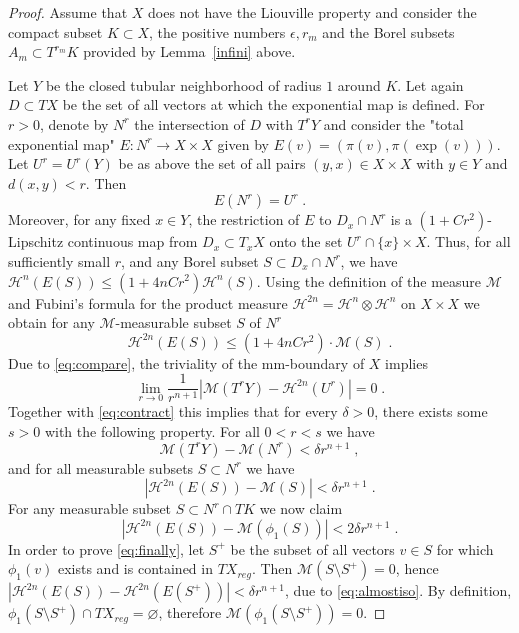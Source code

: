 \documentclass[12pt,leqno]{amsart}
\numberwithin{equation}{section}
\theoremstyle{definition}
\theoremstyle{remark}
\newcommand{\lref}[1]{Lemma~\ref{#1}}
\def\:{\colon}
\def\emptyset{\varnothing}
\begin{document}
\begin{proof}
Assume that $X$ does not have the Liouville property and consider the compact subset $K \subset X$, the positive numbers $\epsilon, r_m$ and the Borel
subsets $A_m\subset T^{r_m} K$ provided by \lref{infini} above.

Let $Y$ be the closed tubular neighborhood  of radius $1$ around $K$.
Let again $D\subset TX$ be the set of all vectors at which the exponential map is defined.
  For $r>0$, denote  by $N^r$ the intersection of $D$ with $T^r Y$ and consider the "total exponential map"
$E\:N^r \to X\times X$ given by $E(v)= (\pi (v), \pi (\exp (v)))$.   Let $U^r =U^r(Y)$ be as above the set of all
  pairs $(y,x) \in X\times X$ with $y\in Y$ and $d(x,y)<r$. Then
\begin{equation} \label{eq:image}
E(N^r) =U^r \; .
\end{equation}
Moreover, for any  fixed $x \in Y$, the restriction of $E$ to $D_x \cap N^r$ is
a $(1+ C r^2)$-Lipschitz continuous map from $D_x\subset T_xX$ onto the set  $U^r \cap \{x \} \times X$.
Thus, for all sufficiently small $r$, and any Borel subset $S\subset D_x \cap N^r$, we have
$\mathcal H^n (E(S)) \leq (1+4n C r^2) \mathcal H^n (S)$.  Using the definition of the measure $\mathcal M$ and  Fubini's formula for the product measure
$\mathcal H^{2n} =\mathcal H^n \otimes \mathcal H^n $ on $X\times X$ we obtain for any $\mathcal M$-measurable subset $S$ of $N^r$
\begin{equation} \label{eq:contract}
\mathcal H^{2n} (E(S)) \leq (1+4nC r^2) \cdot \mathcal M(S)\; .
\end{equation}
Due to \eqref{eq:compare}, the triviality of the mm-boundary of $X$ implies
$$\lim _{r\to 0} \frac 1 {r^{n+1} } |\mathcal M(T^r Y) -\mathcal H^{2n} (U^r)| =0 \;.$$
	Together with  \eqref{eq:contract} this implies that for every  $\delta >0$, there exists some $s>0$ with the following property. For all $0<r<s$
	we have
	\begin{equation}  \label{eq:almostall}
	\mathcal M (T^r Y)- \mathcal M (N^r) < \delta r^{n+1} \; ,
	\end{equation}
	and  for all measurable subsets $S\subset N^r$ we have
	\begin{equation}  \label{eq:almostiso}
	|\mathcal H^{2n} (E(S)) - \mathcal M  (S)|  < \delta r^{n+1} \;.
\end{equation}
For any measurable subset $S\subset N^r \cap TK$  we now claim
\begin{equation} \label{eq:finally}
|\mathcal H^{2n} (E(S)) - \mathcal M (\phi _1 (S))|  <  2 \delta r^{n+1} \; .
\end{equation}
In order to prove \eqref{eq:finally}, let $S^+$ be the subset of all vectors $v\in S $ for which $\phi_1 (v)$ exists  and is contained in $TX_{reg}$.
Then $ \mathcal M (S\setminus S^+ )=0 $, hence $|\mathcal H^{2n} (E(S))- \mathcal H^{2n} (E(S^+))|< \delta r^{n+1} $, due to  \eqref{eq:almostiso}.
 By definition, $\phi _1 (S\setminus S^+)\cap TX_{reg} =\emptyset$, therefore $\mathcal M (\phi _1 (S\setminus S^+)) =0$.



\end{proof}
\end{document}
